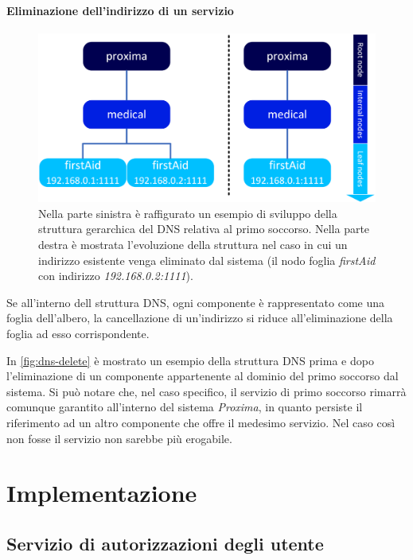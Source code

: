 \documentclass[a4paper,12pt]{report}
\begin{document}
\subsubsection{Eliminazione dell'indirizzo di un servizio}
\begin{figure}[H]
	\centering
	\includegraphics[scale=0.7]{./img/dns-delete.png}
	\caption{Nella parte sinistra è raffigurato un esempio di sviluppo della struttura gerarchica del DNS relativa al primo soccorso. Nella parte destra è mostrata l'evoluzione della struttura nel caso in cui un indirizzo esistente venga eliminato dal sistema (il nodo foglia \emph{firstAid} con indirizzo \emph{192.168.0.2:1111}). }
	\label{fig:dns-delete}
\end{figure}
Se all'interno dell struttura DNS, ogni componente è rappresentato come una foglia dell'albero, la cancellazione di un'indirizzo si riduce all'eliminazione della foglia ad esso corrispondente. 

In \autoref{fig:dns-delete} è mostrato un esempio della struttura DNS prima e dopo l'eliminazione di un componente appartenente al dominio del primo soccorso dal sistema. Si può notare che, nel caso specifico, il servizio di primo soccorso rimarrà comunque garantito all'interno del sistema \emph{Proxima}, in quanto persiste il riferimento ad un altro componente che offre il medesimo servizio. Nel caso così non fosse il servizio non sarebbe più erogabile.

\chapter{Implementazione}

\section{Servizio di autorizzazioni degli utente}
\end{document}
